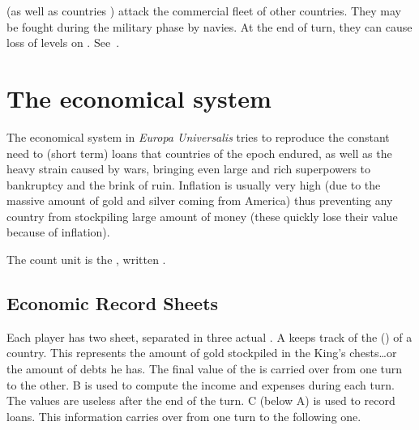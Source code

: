 
  \corsaire (as well as countries
\corsaire) attack the commercial fleet of other countries.
\bparag They may be fought during the military phase by navies.
\bparag At the end of turn, they can cause loss of levels on \TradeFLEET.
\bparag See~.




\section{The economical system}

\aparag The economical system in \emph{Europa Universalis} tries to reproduce
the constant need to (short term) loans that countries of the epoch endured,
as well as the heavy strain caused by wars, bringing even large and rich
superpowers to bankruptcy and the brink of ruin. Inflation is usually very
high (due to the massive amount of gold and silver coming from America) thus
preventing any country from stockpiling large amount of money (these quickly
lose their value because of inflation).

\aparag The count unit is the , written \Ducats.



\subsection{Economic Record Sheets}

\aparag Each player has two sheet, separated in three actual \EcoRS.
\bparag \EcoRS A keeps track of the  (\RT) of a
country. This represents the amount of gold stockpiled in the King's
chests\ldots or the amount of debts he has. The final value of the \RT is
carried over from one turn to the other.
\bparag \EcoRS B is used to compute the income and expenses during each
turn. The values are useless after the end of the turn.
\bparag \EcoRS C (below \EcoRS A) is used to record loans. This information
carries over from one turn to the following one.


